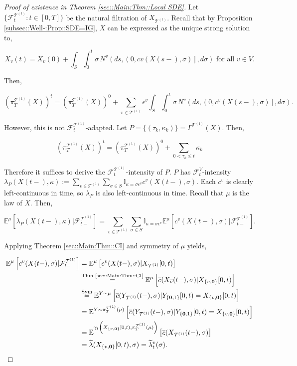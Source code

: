 \documentclass[12pt]{article}
\newcommand{\mb}{\mathbb}
\newcommand{\mc}{\mathcal}
\newcommand{\ov}{\overline}
\newcommand{\os}{\overset}
\newcommand{\te}{\text}
\newcommand{\ep}{\epsilon}
\newcommand{\exmu}[2]{\mb{E}^{#1}\left[#2\right]}	%
\renewcommand{\root}{\mathbf{0}}				%
\renewcommand{\v}{v}							%
\renewcommand{\S}{S}							%
\newcommand{\s}{\sigma}							%
\newcommand{\ev}{\ep}							%
\newcommand{\T}{T}								%
\renewcommand{\t}{t}							%
\newcommand{\proj}{\pi}							%
\renewcommand{\tt}{s}							%
\newcommand{\F}{\mc{F}}							%
\newcommand{\X}{X}								%
\newcommand{\IGr}{c}							%
\newcommand{\vind}[1]{^{#1}}					%
\newcommand{\vsi}[1]{^{#1}}						%
\newcommand{\cind}[1]{_{#1}}					%
\newcommand{\cl}{\ov}							%
\newcommand{\tp}[1]{(#1)}						%
\newcommand{\tip}[1]{#1}						%
\newcommand{\ts}[1]{_{#1}}						%
\newcommand{\IGrg}{\ov{c}}						%
\newcommand{\tree}{\mc{T}}						%
\newcommand{\sln}[1]{^{(#1)}}					%
\newcommand{\poiss}{N}							%
\newcommand{\rate}{\lambda}						%
\newcommand{\alt}[1]{\widetilde{#1}}			%
\newcommand{\pra}[1]{_{#1}}						%
\newcommand{\indx}[1]{_{#1}}					%
\newcommand{\m}{\mu}							%
\newcommand{\cm}{\gamma}						%
\newcommand{\XX}{Y}								%
\newcommand{\rt}{\tau}							%
\renewcommand{\it}{k}							%
\newcommand{\pmap}{\Gamma}						%
\renewcommand{\mark}{\kappa}					%
\newcommand{\rp}{P}								%
\newcommand{\crate}{\alt{\lambda}}				%
\begin{document}
\begin{proof}[Proof of existence in Theorem \ref{sec::Main:Thm::Local SDE}]

Let \(\{\F\vsi{\tree\sln{1}}\ts{\t}:\t\in [0,\T]\}\) be the natural filtration of \(\X\cind{\tree\sln{1}}\). Recall that by Proposition \ref{subsec::Well-:Prop::SDE=IG}, \(\X\) can be expressed as the unique strong solution to,

\[\X\cind{\v}\tp{\t} = \X\cind{\v}\tp{0} + \int_\S\int_0^\t \s\,\poiss\vind{\v}\left(d\tt,\left(0,c{\v}(\X\tp{\tt-},\s)\right],d\s\right) \te{ for all } \v \in V.\]

Then,

\[\left(\proj\vsi{\tree\sln{1}}\ts{\T}(\X)\right)^\t = \left(\proj\vsi{\tree\sln{1}}\ts{\T}(\X)\right)^0 + \sum_{\v \in \tree\sln{1}}\ev\vind{\v}\int_\S\int_0^\t \s\,\poiss\vind{\v}\left(d\tt,\left(0,\IGr\vind{\v}(\X\tp{\tt-},\s)\right],d\s\right).\]

However, this is not \(\F\vsi{\tree\sln{1}}\ts{\t}\)-adapted. Let \(\rp = \{(\rt\indx{\it},\mark\indx{\it})\} = \pmap\vind{\tree\sln{1}}(\X).\) Then,

\[\left(\proj\vsi{\tree\sln{1}}\ts{\T}(\X)\right)^\t = \left(\proj\vsi{\tree\sln{1}}\ts{\T}(\X)\right)^0 + \sum_{0 < \rt\indx{\it} \leq \t}\mark\indx{\it}\]

Therefore it suffices to derive the \(\F\vsi{\tree\sln{1}}\ts{\t}\)-intensity of \(\rp\). \(\rp\) has \(\F\vsi{V}\ts{\t}\)-intensity \(\rate\pra{\rp}(\X\tp{\t-},\mark) := \sum_{\v \in \tree\sln{1}}\sum_{\s\in \S}\mb{I}_{\mark = \s\ev\vind{\v}}\IGr\vind{\v}(\X\tp{\t-},\s)\). Each \(\IGr\vind{\v}\) is clearly left-continuous in time, so \(\rate\pra{\rp}\) is also left-continuous in time. Recall that \(\m\) is the law of \(\X\). Then,

\[\exmu{\m}{\rate\pra{\rp}(\X\tp{\t-},\mark)|\F\vsi{\tree\sln{1}}\ts{\t-}} = \sum_{\v \in \tree\sln{1}}\sum_{\s\in \S} \mb{I}_{\mark = \s\ev\vind{\v}}\exmu{\m}{\IGr\vind{\v}(\X\tp{\t-},\s)|\F\vsi{\tree\sln{1}}\ts{\t-}}.\]

Applying Theorem \ref{sec::Main:Thm::CI} and symmetry of \(\m\) yields,

\begin{align*}
\exmu{\m}{\IGr\vind{\v}(\X\tp{\t-},\s)|\F\vsi{\tree\sln{1}}\ts{\t-}} &= \exmu{\m}{\IGr\vind{\v}(\X\tp{\t-},\s)|\X\cind{\tree\sln{1}}\tip{[0,\t)}}\\
&\os{\te{Thm \ref{sec::Main:Thm::CI}}}{=} \exmu{\m}{\IGrg(\X\cind{\cl{\v}}\tp{\t-},\s)|\X\cind{\{\v,\root\}}\tip{[0,\t)}} \\
&\os{\te{Sym}}{=} \exmu{\XX\sim \m}{\IGrg(\XX\cind{\tree\sln{1}}\tp{\t-},\s)|\XX\cind{\{\root,1\}}\tip{[0,\t)} = \X\cind{\{\v,\root\}}\tip{[0,\t)}}\\
&= \exmu{\XX\sim \proj\vsi{\tree\sln{1}}\ts{\T}(\m)}{\IGrg(\XX\cind{\tree\sln{1}}\tp{\t-},\s)|\XX\cind{\{\root,1\}}\tip{[0,\t)} = \X\cind{\{\v,\root\}}\tip{[0,\t)}}\\
&= \exmu{\cm\ts{\t}\left(\X\cind{\{\v,\root\}}\tip{[0,\t)},\proj\vsi{\tree\sln{1}}\ts{\T}(\m)\right)}{\IGrg(\X\cind{\tree\sln{1}}\tp{\t-},\s)}\\
&=\crate(\X\cind{\{\v,\root\}}\tip{[0,\t)},\s) = \crate\vind{\v}\ts{\t}(\s).
\end{align*}


\end{proof}
\end{document}
